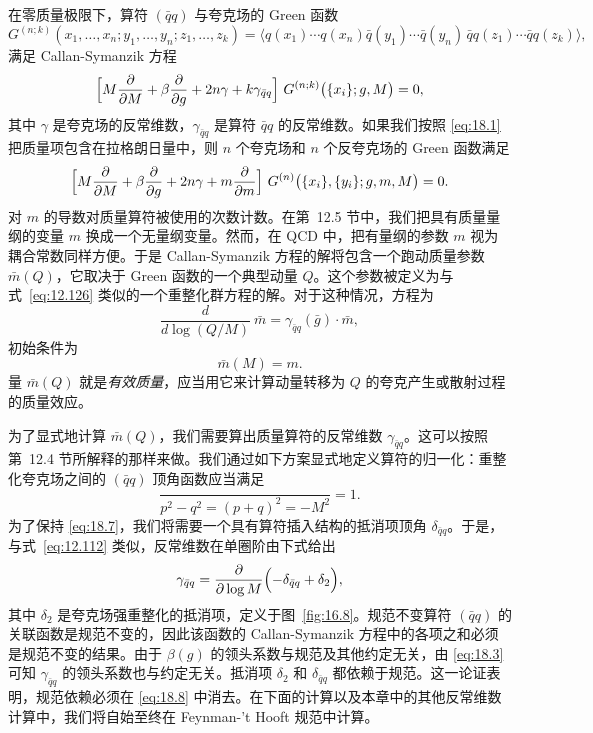 在零质量极限下，算符 $(\bar{q}q)$ 与夸克场的 Green 函数
\begin{equation}
  G^{(n;k)}(x_1, \ldots, x_n; y_1, \ldots, y_n; z_1, \ldots, z_k)
  = \bigl\langle q(x_1)\cdots q(x_n)\bar{q}(y_1)\cdots\bar{q}(y_n)\,
    \bar{q}q(z_1)\cdots\bar{q}q(z_k) \bigr\rangle ,
  \label{eq:18.2}
\end{equation}
满足 Callan-Symanzik 方程
\begin{equation}
  \Bigl[ M\frac{\partial}{\partial M} + \beta\frac{\partial}{\partial g}
    + 2n\gamma + k\gamma_{\bar{q}q} \Bigr]\ G^{(n;k)}\bigl( \{x_i\}; g, M
    \bigr) = 0 ,
  \label{eq:18.3}
\end{equation}
其中 $\gamma$ 是夸克场的反常维数，$\gamma_{\bar{q}q}$ 是算符 $\bar{q}q$ 的反常维数。如果我们按照 \eqref{eq:18.1} 把质量项包含在拉格朗日量中，则 $n$ 个夸克场和 $n$ 个反夸克场的 Green 函数满足
\begin{equation}
  \Bigl[ M\frac{\partial}{\partial M} + \beta\frac{\partial}{\partial g}
    + 2n\gamma + m\frac{\partial}{\partial m} \Bigr]\ G^{(n)}\bigl(
      \{x_i\}, \{y_i\}; g, m, M \bigr) = 0 .
  \label{eq:18.4}
\end{equation}
对 $m$ 的导数对质量算符被使用的次数计数。在第~12.5 节中，我们把具有质量量纲的变量 $m$ 换成一个无量纲变量。然而，在 QCD 中，把有量纲的参数 $m$ 视为耦合常数同样方便。于是 Callan-Symanzik 方程的解将包含一个跑动质量参数 $\bar{m}(Q)$，它取决于 Green 函数的一个典型动量 $Q$。这个参数被定义为与式~\eqref{eq:12.126} 类似的一个重整化群方程的解。对于这种情况，方程为
\begin{equation}
  \frac{d}{d\log(Q/M)}\ \bar{m} = \gamma_{\bar{q}q}(\bar{g})\cdot\bar{m} ,
  \label{eq:18.5}
\end{equation}
初始条件为
\begin{equation}
  \bar{m}(M) = m .
  \label{eq:18.6}
\end{equation}
量 $\bar{m}(Q)$ 就是\emph{有效质量}，应当用它来计算动量转移为 $Q$ 的夸克产生或散射过程的质量效应。

为了显式地计算 $\bar{m}(Q)$，我们需要算出质量算符的反常维数 $\gamma_{\bar{q}q}$。这可以按照第~12.4 节所解释的那样来做。我们通过如下方案显式地定义算符的归一化：重整化夸克场之间的 $(\bar{q}q)$ 顶角函数应当满足
\begin{equation}
  \frac{}{p^2-q^2=(p+q)^2=-M^2} = 1 .
  \label{eq:18.7}
\end{equation}
为了保持 \eqref{eq:18.7}，我们将需要一个具有算符插入结构的抵消项顶角 $\delta_{\bar{q}q}$。于是，与式~\eqref{eq:12.112} 类似，反常维数在单圈阶由下式给出
\begin{equation}
  \gamma_{\bar{q}q} = \frac{\partial}{\partial\log M}\Bigl(
    -\delta_{\bar{q}q} + \delta_2 \Bigr) ,
  \label{eq:18.8}
\end{equation}
其中 $\delta_2$ 是夸克场强重整化的抵消项，定义于图~\ref{fig:16.8}。规范不变算符 $(\bar{q}q)$ 的关联函数是规范不变的，因此该函数的 Callan-Symanzik 方程中的各项之和必须是规范不变的结果。由于 $\beta(g)$ 的领头系数与规范及其他约定无关，由 \eqref{eq:18.3} 可知 $\gamma_{\bar{q}q}$ 的领头系数也与约定无关。抵消项 $\delta_2$ 和 $\delta_{\bar{q}q}$ 都依赖于规范。这一论证表明，规范依赖必须在 \eqref{eq:18.8} 中消去。在下面的计算以及本章中的其他反常维数计算中，我们将自始至终在 Feynman-'t Hooft 规范中计算。

